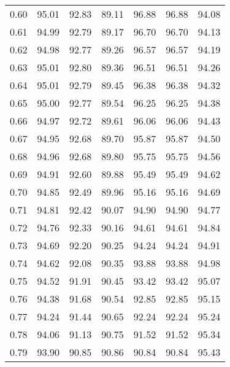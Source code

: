 \begin{tabular}{|c|c|c|c|c|c|c|}
      0.60 &     95.01 &     92.83 &      89.11 &   96.88 &      96.88 &         94.08 \\
      0.61 &     94.99 &     92.79 &      89.17 &   96.70 &      96.70 &         94.13 \\
      0.62 &     94.98 &     92.77 &      89.26 &   96.57 &      96.57 &         94.19 \\
      0.63 &     95.01 &     92.80 &      89.36 &   96.51 &      96.51 &         94.26 \\
      0.64 &     95.01 &     92.79 &      89.45 &   96.38 &      96.38 &         94.32 \\
      0.65 &     95.00 &     92.77 &      89.54 &   96.25 &      96.25 &         94.38 \\
      0.66 &     94.97 &     92.72 &      89.61 &   96.06 &      96.06 &         94.43 \\
      0.67 &     94.95 &     92.68 &      89.70 &   95.87 &      95.87 &         94.50 \\
      0.68 &     94.96 &     92.68 &      89.80 &   95.75 &      95.75 &         94.56 \\
      0.69 &     94.91 &     92.60 &      89.88 &   95.49 &      95.49 &         94.62 \\
      0.70 &     94.85 &     92.49 &      89.96 &   95.16 &      95.16 &         94.69 \\
      0.71 &     94.81 &     92.42 &      90.07 &   94.90 &      94.90 &         94.77 \\
      0.72 &     94.76 &     92.33 &      90.16 &   94.61 &      94.61 &         94.84 \\
      0.73 &     94.69 &     92.20 &      90.25 &   94.24 &      94.24 &         94.91 \\
      0.74 &     94.62 &     92.08 &      90.35 &   93.88 &      93.88 &         94.98 \\
      0.75 &     94.52 &     91.91 &      90.45 &   93.42 &      93.42 &         95.07 \\
      0.76 &     94.38 &     91.68 &      90.54 &   92.85 &      92.85 &         95.15 \\
      0.77 &     94.24 &     91.44 &      90.65 &   92.24 &      92.24 &         95.24 \\
      0.78 &     94.06 &     91.13 &      90.75 &   91.52 &      91.52 &         95.34 \\
      0.79 &     93.90 &     90.85 &      90.86 &   90.84 &      90.84 &         95.43 \\

\end{tabular}
